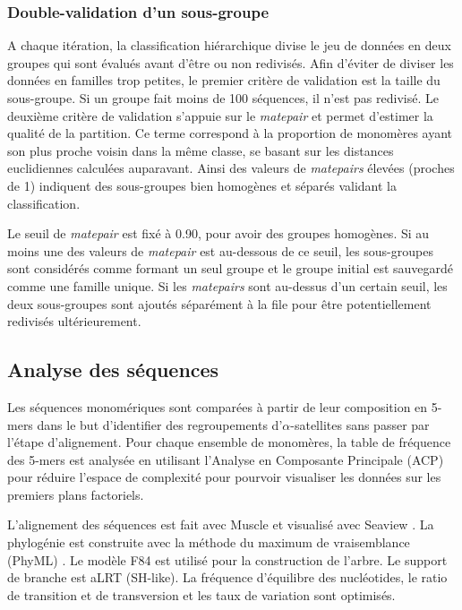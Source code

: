 \documentclass[12pt,a4paper]{article}
\begin{document}
	\subsubsection{Double-validation d'un sous-groupe}
A chaque itération, la classification hiérarchique divise le jeu de données en deux groupes qui sont évalués avant d'être ou non redivisés. Afin d'éviter de diviser les données en familles trop petites, le premier critère de validation est la taille du sous-groupe. Si un groupe fait moins de 100 séquences, il n'est pas redivisé. Le deuxième critère de validation s'appuie sur le \textit{matepair} et permet d'estimer la qualité de la partition. Ce terme correspond à la proportion de monomères ayant son plus proche voisin dans la même classe, se basant sur les distances euclidiennes calculées auparavant. Ainsi des valeurs de \textit{matepairs} élevées (proches de 1) indiquent des sous-groupes bien homogènes et séparés validant la classification.

Le seuil de \textit{matepair} est fixé à 0.90, pour avoir des groupes homogènes. Si au moins une des valeurs de \textit{matepair} est au-dessous de ce seuil, les sous-groupes sont considérés comme formant un seul groupe et le groupe initial est sauvegardé comme une famille unique. Si les \textit{matepairs} sont au-dessus d’un certain seuil, les deux sous-groupes sont ajoutés séparément à la file pour être potentiellement redivisés ultérieurement.

	\subsection{Analyse des séquences}
	
Les séquences monomériques sont comparées à partir de leur composition en 5-mers dans le but d'identifier des regroupements d'$\alpha$-satellites sans passer par l'étape d'alignement. Pour chaque ensemble de monomères,	la table de fréquence des 5-mers est analysée en utilisant l'Analyse en Composante Principale (ACP) pour réduire l'espace de complexité pour pourvoir visualiser les données sur les premiers plans factoriels.
	
L'alignement des séquences est fait avec Muscle \cite{Edgar2004} et visualisé avec Seaview \cite{Galtier1996}. La phylogénie est construite avec la méthode du maximum de vraisemblance (PhyML) \cite{Guindon2009}. Le modèle F84 est utilisé pour la construction de l'arbre. Le support de branche est aLRT (SH-like). La fréquence d'équilibre des nucléotides, le ratio de transition et de transversion et les taux de variation sont optimisés.
\end{document}
